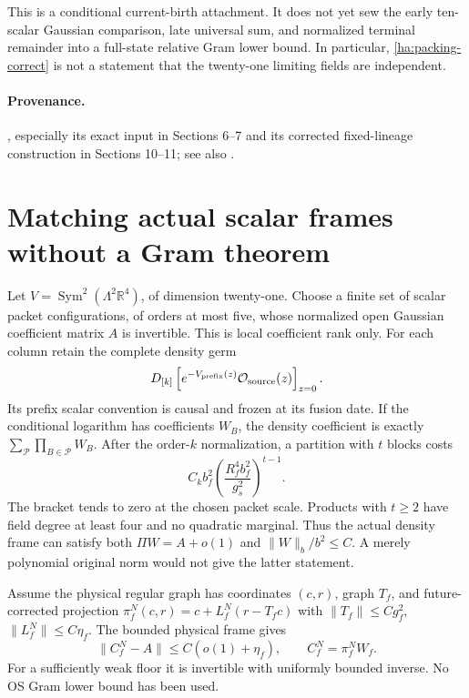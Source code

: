 This is a conditional current-birth attachment.  It does not yet sew the
early ten-scalar Gaussian comparison, late universal sum, and normalized
terminal remainder into a full-state relative Gram lower bound.  In
particular, \eqref{ha:packing-correct} is not a statement that the
twenty-one limiting fields are independent.

\paragraph{Provenance.}
,
especially its exact input in Sections 6--7 and its corrected
fixed-lineage construction in Sections 10--11; see also
.

\section{Matching actual scalar frames without a Gram theorem}
\label{ha:matching}

Let $V=\operatorname{Sym}^2(\Lambda^2\mathbb R^4)$, of dimension twenty-one.
Choose a finite set of scalar packet configurations, of orders at most
five, whose normalized open Gaussian coefficient matrix $A$ is invertible.
This is local coefficient rank only.  For each column retain the complete
density germ
\begin{equation}
 D_{[k]}\left[e^{-V_{\rm prefix}(z)}\mathcal O_{\rm source}(z)\right]_{z=0}.
 \label{ha:density-frame}
\end{equation}
Its prefix scalar convention is causal and frozen at its fusion date.
If the conditional logarithm has coefficients $W_B$, the density
coefficient is exactly $\sum_{\mathcal P}\prod_{B\in\mathcal P}W_B$.
After the order-$k$ normalization, a partition with $t$ blocks costs
\begin{equation}
 C_k b_f^2\left(\frac{R_f^4b_f^2}{g_s^2}\right)^{t-1}.
 \label{ha:density-partition}
\end{equation}
The bracket tends to zero at the chosen packet scale.  Products with
$t\geq2$ have field degree at least four and no quadratic marginal.
Thus the actual density frame can satisfy both
$\Pi W=A+o(1)$ and $\|W\|_b/b^2\leq C$.  A merely polynomial original
norm would not give the latter statement.

Assume the physical regular graph has coordinates $(c,r)$, graph $T_f$,
and future-corrected projection
$\pi_f^N(c,r)=c+L_f^N(r-T_fc)$ with
$\|T_f\|\leq Cg_f^2$, $\|L_f^N\|\leq C\eta_f$.
The bounded physical frame gives
\begin{equation}
 \|C_f^N-A\|\leq C(o(1)+\eta_f),\qquad C_f^N=\pi_f^NW_f.
 \label{ha:matrix-inverse}
\end{equation}
For a sufficiently weak floor it is invertible with uniformly bounded
inverse.  No OS Gram lower bound has been used.

